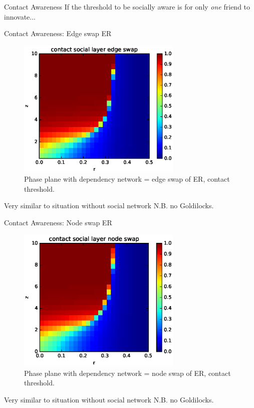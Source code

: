 \documentclass[10pt, xcolor=dvipsnames]{beamer}
\begin{document}
\begin{frame}{Contact Awareness}
If the threshold to be socially aware is for only \emph{one} friend to innovate...
\end{frame}
\begin{frame}{Contact Awareness: Edge swap ER}

\begin{figure}
\centering
\includegraphics[width=0.7\textwidth]{figures/hetero_edge_swap_ER}
\caption{Phase plane with dependency network = edge swap of ER, contact threshold.}
\end{figure}
Very similar to situation without social network N.B. no Goldilocks.

\end{frame}


\begin{frame}{Contact Awareness: Node swap ER}
\begin{figure}
\centering
\includegraphics[width=0.7\textwidth]{figures/hetero_node_swap_ER}
\caption{Phase plane with dependency network = node swap of ER, contact threshold.}
\end{figure}
Very similar to situation without social network N.B. no Goldilocks.

\end{frame}
\end{document}
